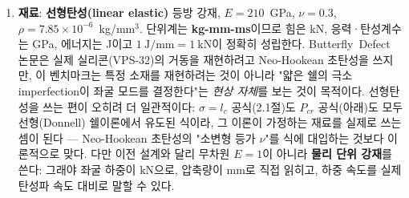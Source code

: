 \documentclass[11pt]{article}
\begin{document}
\begin{enumerate}
\item \textbf{재료}: \textbf{선형탄성(linear elastic)} 등방 강재,
      $E{=}210$~GPa, $\nu{=}0.3$, $\rho{=}7.85\times10^{-6}$~kg/mm$^3$.
      단위계는 \textbf{kg-mm-ms}이므로 힘은 kN, 응력·탄성계수는 GPa,
      에너지는 J이고 $1~\mathrm{J/mm} = 1~\mathrm{kN}$이 정확히 성립한다.
      Butterfly~Defect 논문은 실제 실리콘(VPS-32)의 거동을 재현하려고
      Neo-Hookean 초탄성을 쓰지만, 이 벤치마크는 특정 소재를 재현하려는 것이
      아니라 "얇은 쉘의 극소 imperfection이 좌굴 모드를 결정한다"는
      \emph{현상 자체}를 보는 것이 목적이다. 선형탄성을 쓰는 편이 오히려 더
      일관적이다: $\sigma=l_c$ 공식(2.1절)도 $P_{cr}$ 공식(아래)도 모두
      선형(Donnell) 쉘이론에서 유도된 식이라, 그 이론이 가정하는 재료를 실제로
      쓰는 셈이 된다 --- Neo-Hookean 초탄성의 "소변형 등가 $\nu$"를 식에
      대입하는 것보다 이론적으로 맞다. 다만 이전 설계와 달리 무차원 $E{=}1$이
      아니라 \textbf{물리 단위 강재}를 쓴다: 그래야 좌굴 하중이 kN으로,
      압축량이 mm로 직접 읽히고, 하중 속도를 실제 탄성파 속도 대비로 말할 수
      있다.


\end{enumerate}
\end{document}
